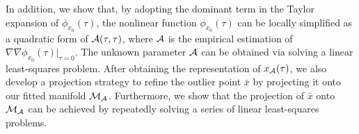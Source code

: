 \documentclass{article}
\theoremstyle{remark}
\begin{document}
In addition, we show that, by adopting the dominant term in the Taylor expansion of $\phi_{x_0}(\tau)$,  the nonlinear function $\phi_{x_0}(\tau)$ can be locally simplified as a quadratic form of ${\cal A}(\tau,\tau)$, where $\cal A$ is the empirical estimation of $\nabla\nabla \phi_{x_0}(\tau)|_{\tau=0}$. The unknown parameter $\cal A$ can be obtained via solving a linear least-squares problem. After obtaining the representation of $x_{\cal A}(\tau)$, we also develop a projection strategy to refine the outlier point $\bar{x}$ by projecting it onto our fitted manifold $\cal M_A$. Furthermore, we show that the projection of $\bar{x}$ onto $\cal M_A$ can be achieved by repeatedly solving a series of linear least-squares problems.
%
\end{document}
